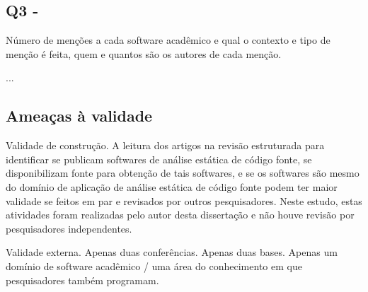 
\subsection{Q3 - \EstudoUmQuestaoTres} %

Número de menções a cada software acadêmico e qual o contexto e tipo de menção
é feita, quem e quantos são os autores de cada menção.

...



\subsection{Ameaças à validade}

Validade de construção.
A leitura dos artigos na revisão estruturada para identificar se publicam
softwares de análise estática de código fonte, se disponibilizam fonte para
obtenção de tais softwares, e se os softwares são mesmo do domínio de aplicação
de análise estática de código fonte podem ter maior validade se feitos em
par e revisados por outros pesquisadores.
Neste estudo, estas atividades foram realizadas pelo autor desta dissertação e 
não houve revisão por pesquisadores independentes.

Validade externa. Apenas duas conferências. Apenas duas bases. Apenas um domínio de software acadêmico / uma área do conhecimento em que pesquisadores também programam.

